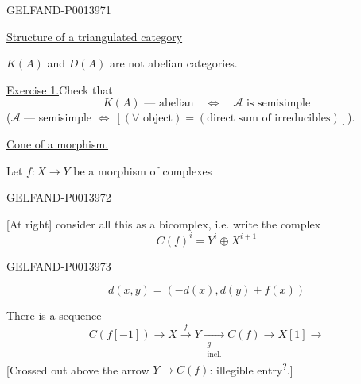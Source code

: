 \begin{GelfandAdjacentEvidence}{GELFAND-P001397}{1}

\uline{Structure of a triangulated category}

\(K(A)\) and \(D(A)\) are not abelian categories.

\uline{Exercise 1.}\quad Check that
\[
K(A)\text{ --- abelian}\quad\Longleftrightarrow\quad
\mathcal A\text{ is semisimple}
\]
(\(\mathcal A\) --- semisimple \(\Longleftrightarrow\
[(\forall\text{ object})=(\text{direct sum of irreducibles})]\)).

\uline{Cone of a morphism.}

Let \(f\colon X\longrightarrow Y\) be a morphism of complexes

\end{GelfandAdjacentEvidence}
\begin{GelfandAdjacentEvidence}{GELFAND-P001397}{2}

[At right] consider all this as a bicomplex, i.e. write the complex
\[
C(f)^i=Y^i\oplus X^{i+1}
\]
\end{GelfandAdjacentEvidence}
\begin{GelfandAdjacentEvidence}{GELFAND-P001397}{3}

\[
d(x,y)=(-d(x),d(y)+f(x))
\]

There is a sequence
\begin{equation*}
C(f[-1])\longrightarrow X\overset{f}{\longrightarrow}Y
\underset{\substack{g\\\text{incl.}}}{\longrightarrow}C(f)
\longrightarrow X[1]\longrightarrow
\tag{4}
\end{equation*}
[Crossed out above the arrow \(Y\to C(f)\):
illegible entry\textsuperscript{?}.]
\end{GelfandAdjacentEvidence}
